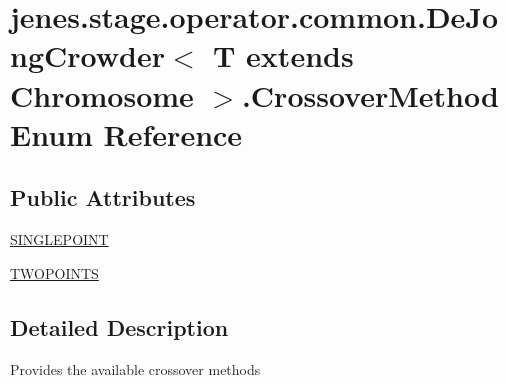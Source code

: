 \hypertarget{enumjenes_1_1stage_1_1operator_1_1common_1_1_de_jong_crowder_3_01_t_01extends_01_chromosome_01_4_1_1_crossover_method}{\section{jenes.\-stage.\-operator.\-common.\-De\-Jong\-Crowder$<$ T extends Chromosome $>$.Crossover\-Method Enum Reference}
\label{enumjenes_1_1stage_1_1operator_1_1common_1_1_de_jong_crowder_3_01_t_01extends_01_chromosome_01_4_1_1_crossover_method}
}
\subsection*{Public Attributes}
\begin{DoxyCompactItemize}
\item 
\hyperlink{enumjenes_1_1stage_1_1operator_1_1common_1_1_de_jong_crowder_3_01_t_01extends_01_chromosome_01_4_1_1_crossover_method_ad183df18f5f62b93addbb68e53ed52d1}{S\-I\-N\-G\-L\-E\-P\-O\-I\-N\-T}
\item 
\hyperlink{enumjenes_1_1stage_1_1operator_1_1common_1_1_de_jong_crowder_3_01_t_01extends_01_chromosome_01_4_1_1_crossover_method_a646b11d127a05b8cdd11eb6c2995a7e1}{T\-W\-O\-P\-O\-I\-N\-T\-S}
\end{DoxyCompactItemize}


\subsection{Detailed Description}
Provides the available crossover methods 

